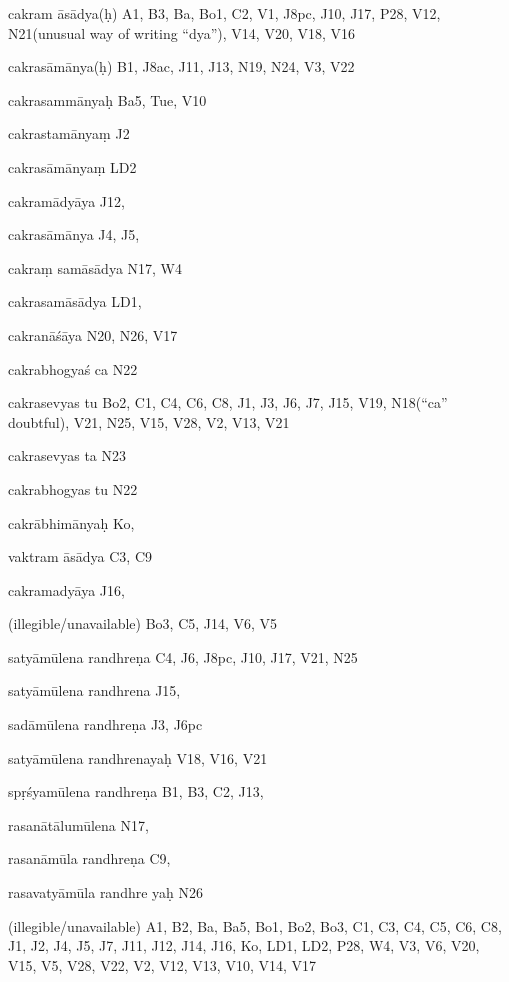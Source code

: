 \begin{ekdosis}
\begin{marma}[hp01_055]
\begin{marma}[hp02_009]
\begin{marma}[hp02_011]
\begin{marma}[hp02_54a]
\begin{description}
        \end{description}
\end{marma}


\begin{marma}[hp02_55a]
\item[cakram āsādya(ḥ)] A1, B3, Ba, Bo1, C2, V1, J8pc, J10, J17, P28, V12, N21(unusual way of writing “dya”), V14, V20, V18, V16
\item[cakrasāmānya(ḥ)] B1, J8ac, J11, J13, N19, N24, V3, V22
\item[cakrasammānyaḥ] Ba5, Tue, V10
\item[cakrastamānyaṃ] J2
\item[cakrasāmānyaṃ] LD2
\item[cakramādyāya] J12,
\item[cakrasāmānya] J4, J5,
\item[cakraṃ samāsādya] N17, W4
\item[cakrasamāsādya] LD1,
\item[cakranāśāya] N20, N26, V17
\item[cakrabhogyaś ca] N22
\item[cakrasevyas tu] Bo2, C1, C4, C6, C8, J1, J3, J6, J7, J15, V19, N18(“ca” doubtful), V21, N25, V15, V28, V2, V13, V21
\item[cakrasevyas ta] N23
\item[cakrabhogyas tu] N22
\item[cakrābhimānyaḥ] Ko,
\item[vaktram āsādya] C3, C9
\item[cakramadyāya] J16,
\item[(illegible/unavailable)] Bo3, C5, J14, V6, V5
 \begin{description}

        \end{description}
\end{marma}


\begin{marma}[hp02_56*1]
\item[satyāmūlena randhreṇa] C4, J6, J8pc, J10, J17, V21, N25
\item[satyāmūlena randhrena] J15,
\item[sadāmūlena randhreṇa] J3, J6pc
\item[satyāmūlena randhrenayaḥ] V18, V16, V21
\item[spṛśyamūlena randhreṇa] B1, B3, C2, J13,  
\item[rasanātālumūlena] N17, 
\item[rasanāmūla randhreṇa] C9, 
\item[rasavatyāmūla randhre yaḥ] N26
\item[]
\item[]
\item[(illegible/unavailable)] A1, B2, Ba, Ba5, Bo1, Bo2, Bo3, C1, C3, C4, C5, C6, C8, J1, J2, J4, J5, J7, J11, J12, J14, J16, Ko, LD1, LD2, P28, W4, V3, V6, V20, V15, V5, V28, V22, V2, V12, V13, V10, V14, V17
 \begin{description}


\end{description}
\end{marma}
\end{marma}
\end{marma}
\end{marma}
\end{ekdosis}
